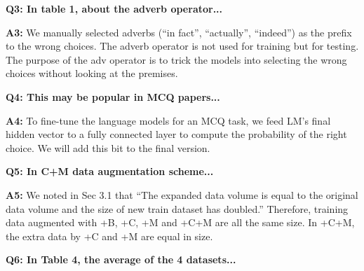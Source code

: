 \documentclass[letterpaper]{article}
\begin{document}
\noindent
\textbf{Q3: In table 1, about the adverb operator...}

\noindent
\textbf{A3:} We manually selected adverbs (``in fact'', ``actually'', 
``indeed'') as the prefix to the wrong choices. 
The adverb operator is not used for training but for testing. 
The purpose of the adv operator is to trick the models into selecting the wrong choices 
without looking at the premises.

\noindent
\textbf{Q4: This may be popular in MCQ papers...}

\noindent
\textbf{A4:} To fine-tune the language models for an MCQ task, we feed LM's final hidden 
vector to a fully connected layer to compute the probability of the right choice. 
We will add this bit to the final version.


\noindent
\textbf{Q5: In C+M data augmentation scheme...}

\noindent
\textbf{A5:} We noted in Sec 3.1 that ``The expanded
data volume is equal to the original data volume and
the size of new train dataset has doubled.'' 
Therefore, training data augmented with +B, +C, +M and +C+M are 
all the same size. In +C+M, the extra data by +C and +M are equal in size.

\noindent
\textbf{Q6: In Table 4, the average of the 4 datasets...}
\end{document}
